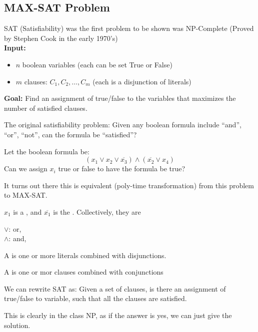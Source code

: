 \documentclass[../main/main.tex]{subfiles}
\begin{document}
\subsection{MAX-SAT Problem}
SAT (Satisfiability) was the first problem to be shown was NP-Complete  (Proved by Stephen Cook in the early 1970's)\\
\textbf{Input:}
\begin{itemize}
	\item 
$n$ boolean variables (each can be set True or False)
\item $m$ clauses: $C_1,C_2,\ldots,C_m$ (each is a disjunction of literals)
\end{itemize}
\textbf{Goal:} Find an assignment of true/false to the variables that maximizes the number of satisfied clauses.
\begin{remark}
The original satisfiability problem: Given any boolean formula include ``and'', ``or'', ``not'', can the formula be ``satisfied''?
\end{remark}
\begin{example}
	Let the boolean formula be:\[
		(x_1 \vee x_2 \vee \overline{x_3})\wedge (\overline{x_2}\vee x_4)
	\] Can we assign $x_i$ true or false to have the formula be true? 
\end{example}
It turns out there this is equivalent (poly-time transformation) from this problem to MAX-SAT.
\begin{definition}
	$x_1$ is a , and $\overline{x_1}$ is the . Collectively, they are 
\end{definition}
\begin{definition}
	$\vee$: or, \\
	$\wedge$: and, 
\end{definition}
\begin{definition}
	A  is one or more literals combined with disjunctions.
\end{definition}
\begin{definition}
	A  is one or mor clauses combined with conjunctions
\end{definition}
We can rewrite SAT as: Given a set of clauses, is there an assignment of true/false to variable, such that all the clauses are satisfied.
\begin{remark}
	This is clearly in the class NP, as if the answer is yes, we can just give the solution.
\end{remark}
\end{document}
